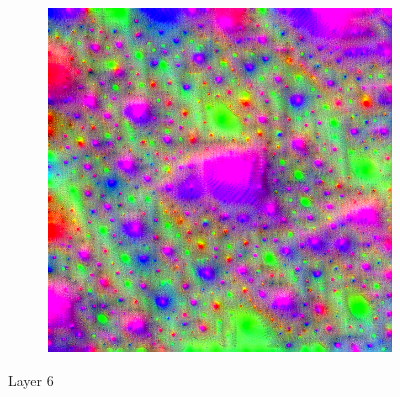 \begin{figure}
    \hfill
    \begin{subfigure}[t]{0.31\textwidth}
        \captionsetup{justification=centering}
        \centering
        \includegraphics[width=.7\linewidth]{figuras/feat_vis/experiments/intermediary/l6/random_image_pl6_lr2.2e-1_layer12.png}
        \caption{}
    \end{subfigure}
    
    \caption{Layer 6}
    
\end{figure}
